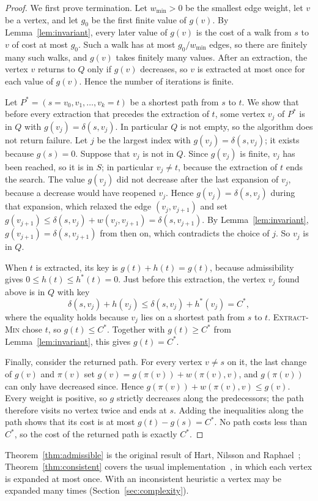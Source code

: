 \begin{proof}
We first prove termination. Let $w_{\min} > 0$ be the smallest edge weight, let
$v$ be a vertex, and let $g_{0}$ be the first finite value of $g(v)$. By
Lemma~\ref{lem:invariant}, every later value of $g(v)$ is the cost of a walk
from $s$ to $v$ of cost at most $g_{0}$. Such a walk has at most
$g_{0} / w_{\min}$ edges, so there are finitely many such walks, and $g(v)$
takes finitely many values. After an extraction, the vertex $v$ returns to $Q$
only if $g(v)$ decreases, so $v$ is extracted at most once for each value of
$g(v)$. Hence the number of iterations is finite.

Let $P^{*} = (s = v_0, v_1, \dots, v_k = t)$ be a shortest path from $s$ to
$t$. We show that before every extraction that precedes the extraction of $t$,
some vertex $v_j$ of $P^{*}$ is in $Q$ with $g(v_j) = \delta(s,v_j)$. In
particular $Q$ is not empty, so the algorithm does not return failure. Let $j$
be the largest index with $g(v_j) = \delta(s,v_j)$; it exists because
$g(s) = 0$. Suppose that $v_j$ is not in $Q$. Since $g(v_j)$ is finite, $v_j$
has been reached, so it is in $S$; in particular $v_j \neq t$, because the
extraction of $t$ ends the search. The value $g(v_j)$ did not decrease after the
last expansion of $v_j$, because a decrease would have reopened $v_j$. Hence
$g(v_j) = \delta(s,v_j)$ during that expansion, which relaxed the edge
$(v_j, v_{j+1})$ and set
$g(v_{j+1}) \le \delta(s,v_j) + w(v_j,v_{j+1}) = \delta(s,v_{j+1})$. By
Lemma~\ref{lem:invariant}, $g(v_{j+1}) = \delta(s,v_{j+1})$ from then on, which
contradicts the choice of $j$. So $v_j$ is in $Q$.

When $t$ is extracted, its key is $g(t) + h(t) = g(t)$, because admissibility
gives $0 \le h(t) \le h^{*}(t) = 0$. Just before this extraction, the vertex
$v_j$ found above is in $Q$ with key
\begin{equation}\label{eq:admbound}
  \delta(s,v_j) + h(v_j) \le \delta(s,v_j) + h^{*}(v_j) = C^{*},
\end{equation}
where the equality holds because $v_j$ lies on a shortest path from $s$ to $t$.
\textsc{Extract-Min} chose $t$, so $g(t) \le C^{*}$. Together with
$g(t) \ge C^{*}$ from Lemma~\ref{lem:invariant}, this gives $g(t) = C^{*}$.

Finally, consider the returned path. For every vertex $v \neq s$ on it, the last
change of $g(v)$ and $\pi(v)$ set $g(v) = g(\pi(v)) + w(\pi(v), v)$, and
$g(\pi(v))$ can only have decreased since. Hence
$g(\pi(v)) + w(\pi(v), v) \le g(v)$. Every weight is positive, so $g$ strictly
decreases along the predecessors; the path therefore visits no vertex twice and
ends at $s$. Adding the inequalities along the path shows that its cost is at
most $g(t) - g(s) = C^{*}$. No path costs less than $C^{*}$, so the cost of the
returned path is exactly $C^{*}$.
\end{proof}

Theorem~\ref{thm:admissible} is the original result of Hart, Nilsson and
Raphael~\cite{hart1968formal}; Theorem~\ref{thm:consistent} covers the usual
implementation~\cite{russell2020aima}, in which each vertex is expanded at most
once. With an inconsistent heuristic a vertex may be expanded many times
(Section~\ref{sec:complexity}).
